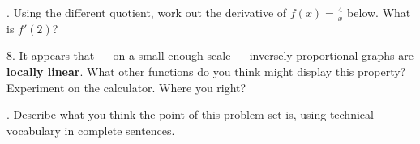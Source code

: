 \begin{multicols*}{2}
\vspace{3cm}
. Using the different quotient, work out the derivative of $f(x)=\frac{4}{x}$ below.
What is $f'(2)$?

\vspace{3cm}
8. It appears that --- on a small enough scale --- inversely proportional graphs
are \textbf{locally linear}.  What other functions do you think might display 
this property?  Experiment on the calculator.  Where you right?

\vspace{4cm}
. Describe what you think the point of this problem set is, using technical vocabulary in complete
sentences.
\end{multicols*}